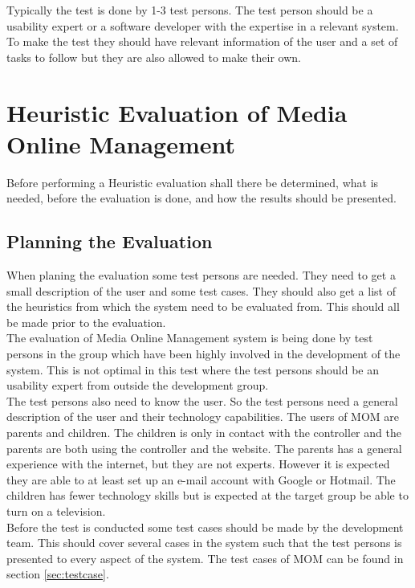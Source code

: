Typically the test is done by 1-3 test persons\citep{HeuristicEvaluation}. The test person should be a usability expert or a software developer with the expertise in a relevant system. To make the test they should have relevant information of the user and a set of tasks to follow but they are also allowed to make their own.


\section{Heuristic Evaluation of Media Online Management}
Before performing a Heuristic evaluation shall there be determined, what is needed, before the evaluation is done, and how the results should be presented\citep{HeuristicEvaluationGuide}.

\subsection{Planning the Evaluation}
When planing the evaluation some test persons are needed. They need to get a small description of the user and some test cases. They should also get a list of the heuristics from which the system need to be evaluated from. This should all be made prior to the evaluation. \\

The evaluation of Media Online Management system is being done by test persons in the group which have been highly involved in the development of the system. This is not optimal in this test where the test persons should be an usability expert from outside the development group\citep{DIEB}.\\

The test persons also need to know the user. So the test persons need a general description of the user and their technology capabilities. The users of MOM are parents and children. The children is only in contact with the controller and the parents are both using the controller and the website. The parents has a general experience with the internet, but they are not experts. However it is expected they are able to at least set up an e-mail account with Google or Hotmail. The children has fewer technology skills but is expected at the target group be able to turn on a television. \\

Before the test is conducted some test cases should be made by the development team. This should cover several cases in the system such that the test persons is presented to every aspect of the system. The test cases of MOM can be found in section \vref{sec:testcase}.\\ 


